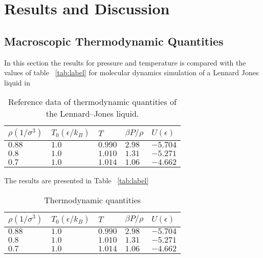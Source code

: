 \documentclass[
10pt, %
a4paper, %
oneside, %
headinclude,footinclude, %
BCOR5mm, %
]{scrartcl}
\begin{document}
\newpage

\section{Results and Discussion}

\subsection{Macroscopic Thermodynamic Quantities}
In this section the results for pressure and temperature is compared with the values of table ~\vref{tab:label} for molecular dynamics simulation of a Lennard Jones liquid in \cite{Thijssen:2013cp}

\begin{table}[hbt]
\caption{Reference data of thermodynamic quantities of the Lennard–Jones liquid.}
\centering
\begin{tabular}{lllll}
\toprule
\toprule
$\rho(1/\sigma^3)$ & $T_0(\epsilon/k_B)$ & $T$ & $\beta P/\rho$ & $U(\epsilon)$ \\
\midrule
$0.88$ & $1.0$ & $0.990$ & $2.98$ & $-5.704$ \\
$0.8$ & $1.0$ & $1.010$ & $1.31$ & $-5.271$ \\
$0.7$ & $1.0$ & $1.014$ & $1.06$ & $-4.662$ \\
\bottomrule
\bottomrule
\end{tabular}
\label{tab:label}
\end{table}

The results are presented in Table ~\vref{tab:label}

\begin{table}[hbt]
\caption{Thermodynamic quantities}
\centering
\begin{tabular}{lllll}
\toprule
\toprule
$\rho(1/\sigma^3)$ & $T_0(\epsilon/k_B)$ & $T$ & $\beta P/\rho$ & $U(\epsilon)$ \\
\midrule
$0.88$ & $1.0$ & $0.990$ & $2.98$ & $-5.704$ \\
$0.8$ & $1.0$ & $1.010$ & $1.31$ & $-5.271$ \\
$0.7$ & $1.0$ & $1.014$ & $1.06$ & $-4.662$ \\
\bottomrule
\bottomrule
\end{tabular}
\label{tab:label}
\end{table}
\end{document}
